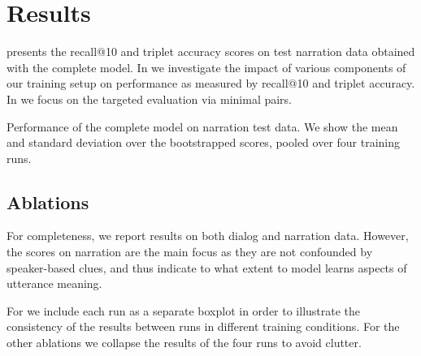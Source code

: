 \section{Results}

 presents the recall@10 and triplet accuracy
scores on test narration data obtained with the complete model.  In
 we investigate the impact of various components
of our training setup on performance as measured by recall@10 and
triplet accuracy.  In  we focus on the
targeted evaluation via minimal pairs.  

\label{sec:results}
\begin{table}[htb]
  
  \caption{Performance of the complete model on narration test
  	data. We show the mean and standard deviation over the
  	bootstrapped scores, pooled over four training runs.}
  \label{tab:test_scores}
\end{table}


\subsection{Ablations}
\label{sec:ablations}
For completeness, we report results on both dialog and narration
data. However, the scores on narration are the main focus as they are
not confounded by speaker-based clues, and thus indicate to what
extent to model learns aspects of utterance meaning.

For  we include each run as a separate boxplot
in order to illustrate the consistency of the results between runs in
different training conditions.  For the other ablations we collapse
the results of the four runs to avoid clutter.

